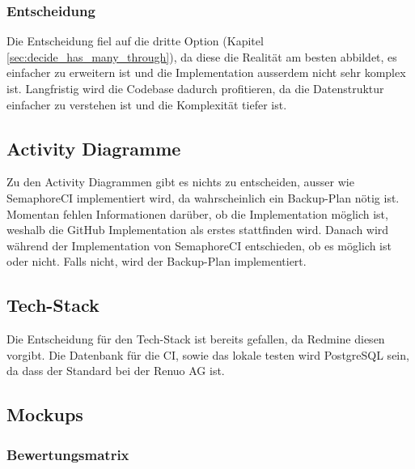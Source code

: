 \subsubsection{Entscheidung}
Die Entscheidung fiel auf die dritte Option (Kapitel \ref{sec:decide_has_many_through}), da diese die Realität am besten
abbildet, es einfacher zu erweitern ist und die Implementation ausserdem nicht sehr komplex ist. \newline
Langfristig wird die Codebase dadurch profitieren, da die Datenstruktur einfacher zu verstehen ist und die Komplexität
tiefer ist. \newline

\subsection{Activity Diagramme}
Zu den Activity Diagrammen gibt es nichts zu entscheiden, ausser wie SemaphoreCI implementiert wird,
da wahrscheinlich ein Backup-Plan nötig ist. \newline
Momentan fehlen Informationen darüber, ob die Implementation möglich ist, weshalb die GitHub Implementation als erstes
stattfinden wird. Danach wird während der Implementation von SemaphoreCI entschieden, ob es möglich ist oder nicht. Falls
nicht, wird der Backup-Plan implementiert. \newline

\subsection{Tech-Stack}
Die Entscheidung für den Tech-Stack ist bereits gefallen, da Redmine diesen vorgibt. \newline
Die Datenbank für die CI, sowie das lokale testen wird PostgreSQL sein, da dass der Standard bei der Renuo AG ist.
\newline

\subsection{Mockups}
\subsubsection{Bewertungsmatrix}
\begin{center}
\end{center}

